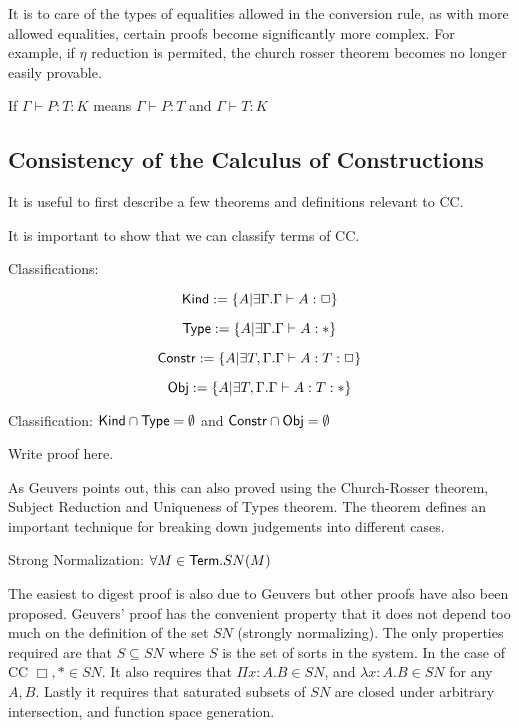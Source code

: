 It is to care of the types of equalities allowed in the conversion rule, as with more allowed equalities, certain proofs
become significantly more complex.  For example, if $\eta$ reduction is permited, the church rosser theorem becomes no longer
easily provable.

\begin{definition}
If $\Gamma \vdash P : T : K$ means $\Gamma \vdash P : T$ and $\Gamma \vdash T : K$
\end{definition}


\subsection{Consistency of the Calculus of Constructions}

It is useful to first describe a few theorems and definitions relevant to CC.  

It is important to show that we can classify \citep{Geuvers94ashort} terms of CC.

\begin{definition}
Classifications:

\[
\mathsf{Kind} := \{ A | \exists \Gamma . \Gamma \vdash A : \Box \}
\]

\[
\mathsf{Type} := \{ A | \exists \Gamma . \Gamma \vdash A : * \}
\]

\[
\mathsf{Constr} := \{ A | \exists T,\Gamma . \Gamma \vdash A : T:\Box \}
\]

\[
\mathsf{Obj} := \{ A | \exists T,\Gamma . \Gamma \vdash A : T:* \}
\]

\end{definition}

\begin{theorem}
Classification:
$\mathsf{Kind}\cap \mathsf{Type} = \emptyset$ 
and
$\mathsf{Constr}\cap \mathsf{Obj} = \emptyset$ 
\end{theorem}

Write proof here.

As Geuvers points out, this can also proved using the Church-Rosser theorem, 
Subject Reduction and Uniqueness of Types theorem.  
The theorem defines an important technique for breaking down judgements into
different cases.

\begin{theorem}
Strong Normalization:
$\forall M \in \mathsf{Term}. SN(M)$
\end{theorem}

The easiest to digest proof is also due to Geuvers \citep{Geuvers94ashort} 
but other proofs have also been proposed.  Geuvers' proof has the convenient
property that it does not depend too much on the definition of the set $SN$ 
(strongly normalizing). The only properties required are that $S \subseteq SN$ 
where $S$ is the set of sorts in the system. In the case of CC $\Box,* \in SN$.
It also requires that $\Pi x : A . B \in SN$, and $\lambda x : A . B \in SN$ 
for any $A,B$.  Lastly it requires that saturated subsets of $SN$ are closed under
arbitrary intersection, and function space generation.

